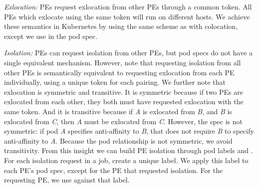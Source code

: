 %
%

\emph{Exlocation:} PEs request exlocation from other PEs through a common token.
All PEs which exlocate using the same token will run on different hosts. We
achieve these semantics in Kubernetes by using the same scheme as with
colocation, except we use  in the pod spec.

\emph{Isolation:} PEs can request isolation from other PEs, but pod specs do not
have a single equivalent mechanism. However, note that requesting isolation from
all other PEs is semantically equivalent to requesting exlocation from each PE
individually, using a unique token for each pairing. We further note that
exlocation is symmetric and transitive. It is symmetric because if two PEs are
exlocated from each other, they both must have requested exlocation with the
same token. And it is transitive because if \emph{A} is exlocated from \emph{B},
and \emph{B} is exlocated from \emph{C}, then \emph{A} must be exlocated from
\emph{C}. However, the  spec is not symmetric: if pod
\emph{A} specifies anti-affinity to \emph{B}, that does not require \emph{B} to
specify anti-affinity to \emph{A}. Because the pod relationship is not
symmetric, we avoid transitivity. From this insight we can build PE isolation
through pod labels and .  For each isolation request in a
job, create a unique label. We apply this label to each PE's pod spec, except
for the PE that requested isolation. For the requesting PE, we use
 against that label.

